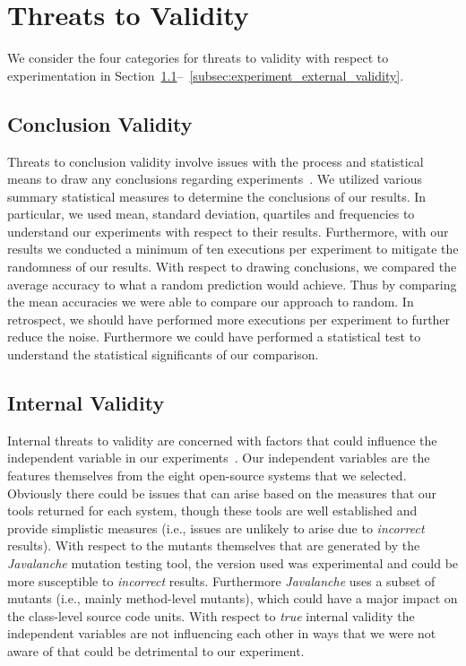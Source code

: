 \section{Threats to Validity}
\label{sec:experiment_threats}
We consider the four categories for threats to validity with respect to experimentation in Section~\ref{subsec:experiment_conclusion_validity}--~\ref{subsec:experiment_external_validity}.


\subsection{Conclusion Validity}
\label{subsec:experiment_conclusion_validity}
Threats to conclusion validity involve issues with the process and statistical means to draw any conclusions regarding experiments~\cite{WRH+00,WKP10}. We utilized various summary statistical measures to determine the conclusions of our results. In particular, we used mean, standard deviation, quartiles and frequencies to understand our experiments with respect to their results. Furthermore, with our results we conducted a minimum of ten executions per experiment to mitigate the randomness of our results. With respect to drawing conclusions, we compared the average accuracy to what a random prediction would achieve. Thus by comparing the mean accuracies we were able to compare our approach to random. In retrospect, we should have performed more executions per experiment to further reduce the noise. Furthermore we could have performed a statistical test to understand the statistical significants of our comparison.


\subsection{Internal Validity}
\label{subsec:experiment_internal_validity}
Internal threats to validity are concerned with factors that could influence the independent variable in our experiments~\cite{WRH+00,WKP10}. Our independent variables are the features themselves from the eight open-source systems that we selected. Obviously there could be issues that can arise based on the measures that our tools returned for each system, though these tools are well established and provide simplistic measures (i.e., issues are unlikely to arise due to \emph{incorrect} results). With respect to the mutants themselves that are generated by the \emph{Javalanche} mutation testing tool, the version used was experimental and could be more susceptible to \emph{incorrect} results. Furthermore \emph{Javalanche} uses a subset of mutants (i.e., mainly method-level mutants), which could have a major impact on the class-level source code units. With respect to \emph{true} internal validity the independent variables are not influencing each other in ways that we were not aware of that could be detrimental to our experiment.


